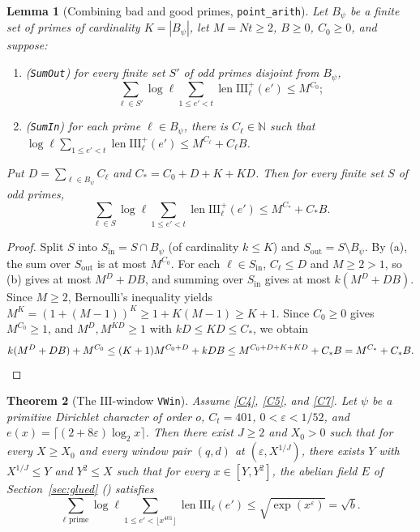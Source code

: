 \documentclass[11pt]{amsart}
\newcommand{\N}{\mathbb{N}}
\newcommand{\eps}{\varepsilon}
\newcommand{\Sha}{\mathrm{III}}
\DeclareMathOperator{\len}{len}
\theoremstyle{plain}
\newtheorem{theorem}{Theorem}[section]
\newtheorem{lemma}[theorem]{Lemma}
\theoremstyle{definition}
\numberwithin{equation}{section}
\begin{document}
\begin{lemma}[Combining bad and good primes, \texttt{point\_arith}]\label{lem:pointHV}
Let $B_\psi$ be a finite set of primes of cardinality $K=|B_\psi|$, let $M=Nt\ge2$, $B\ge0$,
$C_0\ge0$, and suppose:
\begin{enumerate}[label=(\alph*)]
\item \textup{(\texttt{SumOut})} for every finite set $S'$ of odd primes disjoint from $B_\psi$,
  \[
  \sum_{\ell\in S'}\log\ell\sum_{1\le e'<t}\len\Sha_\ell^+(e')\le M^{C_0};
  \]
\item \textup{(\texttt{SumIn})} for each prime $\ell\in B_\psi$, there is $C_\ell\in\N$ such that
  $\log\ell\sum_{1\le e'<t}\len\Sha_\ell^+(e')\le M^{C_\ell}+C_\ell B$.
\end{enumerate}
Put $D=\sum_{\ell\in B_\psi}C_\ell$ and $C_\ast=C_0+D+K+KD$. Then for every finite set $S$ of odd
primes,
\begin{equation}\label{eq:pointHV}
\sum_{\ell\in S}\log\ell\sum_{1\le e'<t}\len\Sha_\ell^+(e')\le M^{C_\ast}+C_\ast B.
\end{equation}
\end{lemma}

\begin{proof}
Split $S$ into $S_{\mathrm{in}}=S\cap B_\psi$ (of cardinality $k\le K$) and
$S_{\mathrm{out}}=S\setminus B_\psi$. By (a), the sum over $S_{\mathrm{out}}$ is at most $M^{C_0}$.
For each $\ell\in S_{\mathrm{in}}$, $C_\ell\le D$ and $M\ge2>1$, so (b) gives at most $M^D+DB$,
and summing over $S_{\mathrm{in}}$ gives at most $k(M^D+DB)$. Since $M\ge2$, Bernoulli's inequality
yields $M^K=(1+(M-1))^K\ge 1+K(M-1)\ge K+1$. Since $C_0\ge0$ gives $M^{C_0}\ge1$, and
$M^D,M^{KD}\ge1$ with $kD\le KD\le C_\ast$, we obtain
\[
k(M^D+DB)+M^{C_0}\le (K+1)M^{C_0+D}+kDB\le M^{C_0+D+K+KD}+C_\ast B=M^{C_\ast}+C_\ast B. \qedhere
\]
\end{proof}

\begin{theorem}[The $\Sha$-window \texttt{VWin}]\label{thm:VWin}
Assume \ref{C4}, \ref{C5}, and \ref{C7}. Let $\psi$ be a primitive Dirichlet character of order
$o$, $C_t=401$, $0<\eps<1/52$, and $e(x)=\lceil(2+8\eps)\log_2 x\rceil$. Then there exist $J\ge2$
and $X_0>0$ such that for every $X\ge X_0$ and every window pair $(q,d)$ at $(\eps,X^{1/J})$,
there exists $Y$ with $X^{1/J}\le Y$ and $Y^2\le X$ such that for every $x\in[Y,Y^2]$, the abelian
field $E$ of Section~\ref{sec:glued} () satisfies
\begin{equation}\label{eq:VVle}
\sum_{\ell\text{ prime}}\log\ell\sum_{1\le e'<\lfloor x^{401}\rfloor}\len\Sha_\ell(e')
\le \sqrt{\exp(x^\eps)}=\sqrt{b}.
\end{equation}
\end{theorem}
\end{document}
